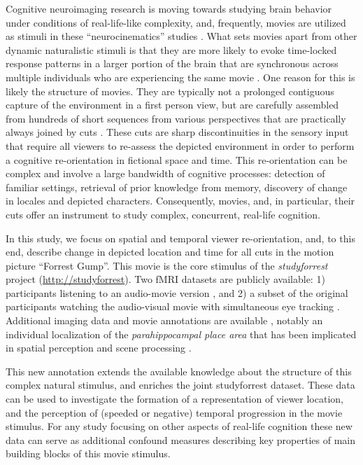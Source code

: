\documentclass[10pt,a4paper,twocolumn]{article}
\begin{document}
Cognitive neuroimaging research is moving towards studying brain behavior under
conditions of real-life-like complexity, and, frequently, movies are utilized
as stimuli in these ``neurocinematics'' studies
\citep{hasson_2008_neurocinematics}. What sets movies apart from other dynamic
naturalistic stimuli is that they are more likely to evoke time-locked response
patterns in a larger portion of the brain that are synchronous across multiple
individuals who are experiencing the same movie
\citep{hasson_2009_natural_stim_review,lankinen_2014_MEG_during_movie}. One
reason for this is likely the structure of movies. They are typically not a
prolonged contiguous capture of the environment in a first person view, but are
carefully assembled from hundreds of short sequences from various perspectives
that are practically always joined by cuts
\citep{cutting_2011_changing_poetics_of_dissolve}. These cuts are sharp
discontinuities in the sensory input that require all viewers to re-assess the
depicted environment in order to perform a cognitive
re-orientation in fictional space and time. This re-orientation can be complex
and involve a large bandwidth of cognitive processes: detection of familiar
settings, retrieval of prior knowledge from memory, discovery of change in
locales and depicted characters. Consequently, movies, and, in particular, their
cuts offer an instrument to study complex, concurrent, real-life cognition.

In this study, we focus on spatial and temporal viewer re-orientation, and, to
this end, describe change in depicted location and time for all cuts in the
motion picture ``Forrest Gump''. This movie is the core stimulus of the
\textit{studyforrest} project (\url{http://studyforrest}). Two fMRI datasets
are publicly available: 1) participants listening to an audio-movie version
\citep{HBI+14}, and 2) a subset of the original participants watching the
audio-visual movie with simultaneous eye tracking \citep{HAK+16}. Additional
imaging data and movie annotations are available \citep{HDH+2015,LRS+2015},
notably an individual localization of the \textit{parahippocampal place area}
\citep{SKG+16} that has been implicated in spatial perception and scene
processing \citep{EK1998}.

This new annotation extends the available knowledge about the structure of this
complex natural stimulus, and enriches the joint studyforrest dataset. These
data can be used to investigate the formation of a representation of viewer
location, and the perception of (speeded or negative) temporal progression in
the movie stimulus. For any study focusing on other aspects of real-life
cognition these new data can serve as additional confound measures describing
key properties of main building blocks of this movie stimulus.
\end{document}
